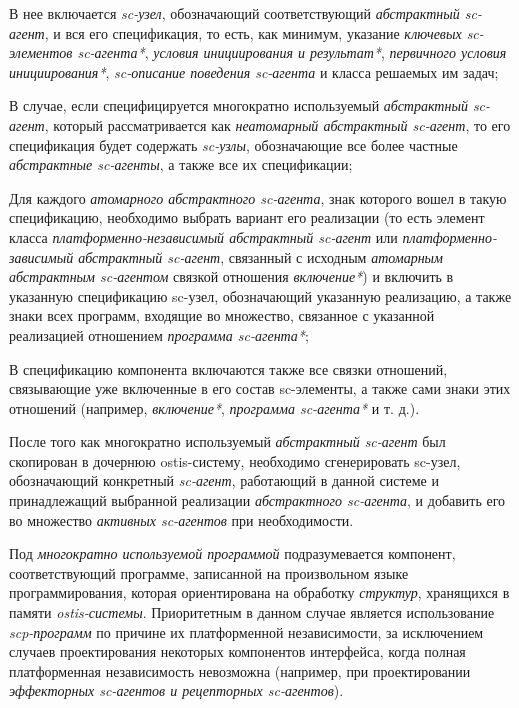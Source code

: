 \begin{textitemize}
    \item В нее включается \textit{sc-узел}, обозначающий соответствующий \textit{абстрактный sc-агент}, и вся его спецификация, то есть, как минимум, указание \textit{ключевых sc-элементов sc-агента*}, \textit{условия инициирования и результат*}, \textit{первичного условия инициирования*}, \textit{sc-описание поведения sc-агента} и класса решаемых им задач;
    \item В случае, если специфицируется многократно используемый \textit{абстрактный sc-агент}, который рассматривается как \textit{неатомарный абстрактный sc-агент}, то его спецификация  будет содержать \textit{sc-узлы}, обозначающие все более частные \textit{абстрактные sc-агенты}, а также все их спецификации;
    \item Для каждого \textit{атомарного абстрактного sc-агента}, знак которого вошел в такую спецификацию, необходимо выбрать вариант его реализации (то есть элемент класса \textit{платформенно-независимый абстрактный sc-агент} или \textit{платформенно-зависимый абстрактный sc-агент}, связанный с исходным \textit{атомарным абстрактным sc-агентом} связкой отношения \textit{включение*}) и включить в указанную спецификацию sc-узел, обозначающий указанную реализацию, а также знаки всех программ, входящие во множество, связанное с указанной реализацией отношением \textit{программа sc-агента*};
    \item В спецификацию компонента включаются также все связки отношений, связывающие уже включенные в его состав sc-элементы, а также сами знаки этих отношений (например, \textit{включение*}, \textit{программа sc-агента*} и т. д.).
\end{textitemize}

После того как многократно используемый \textit{абстрактный sc-агент} был скопирован в дочернюю ostis-систему, необходимо сгенерировать sc-узел, обозначающий конкретный \textit{sc-агент}, работающий в данной системе и принадлежащий выбранной реализации \textit{абстрактного sc-агента}, и добавить его во множество \textit{активных sc-агентов} при необходимости.

Под \textit{многократно используемой программой} подразумевается компонент, соответствующий программе, записанной на произвольном языке программирования, которая ориентирована на обработку \textit{структур}, хранящихся в памяти \textit{ostis-системы}. Приоритетным в данном случае является использование \textit{scp-программ} по причине их платформенной независимости, за исключением случаев проектирования некоторых компонентов интерфейса, когда полная платформенная независимость невозможна (например, при проектировании \textit{эффекторных sc-агентов и рецепторных sc-агентов}).

